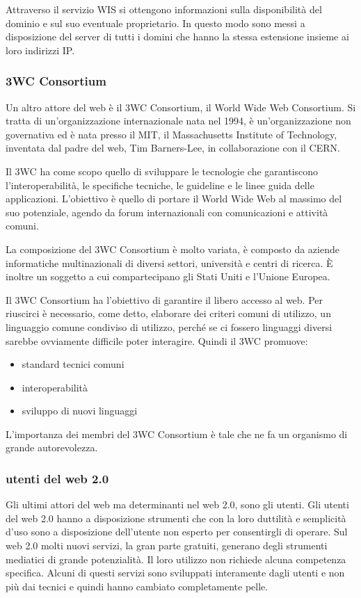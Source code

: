 Attraverso il servizio WIS si ottengono informazioni sulla disponibilità del dominio e sul suo eventuale proprietario. In questo modo sono messi a disposizione del server di tutti i domini che hanno la stessa estensione insieme ai loro indirizzi IP.
\subsubsection{3WC Consortium}

Un altro attore del web è il 3WC Consortium, il World Wide Web Consortium. Si tratta di un'organizzazione internazionale nata nel 1994, è un'organizzazione non governativa ed è nata presso il MIT, il Massachusetts Institute of Technology, inventata dal padre del web, Tim Barners-Lee, in collaborazione con il CERN. \par
Il 3WC ha come scopo quello di sviluppare le tecnologie che garantiscono l'interoperabilità, le specifiche tecniche, le guideline e le linee guida delle applicazioni. L'obiettivo è quello di portare il World Wide Web al massimo del suo potenziale, agendo da forum internazionali con comunicazioni e attività comuni. \par
La composizione del 3WC Consortium è molto variata, è composto da aziende informatiche multinazionali di diversi settori, università e centri di ricerca. È inoltre un soggetto a cui compartecipano gli Stati Uniti e l'Unione Europea. \par
Il 3WC Consortium ha l'obiettivo di garantire il libero accesso al web. Per riuscirci è necessario, come detto, elaborare dei criteri comuni di utilizzo, un linguaggio comune condiviso di utilizzo, perché se ci fossero linguaggi diversi sarebbe ovviamente difficile poter interagire. Quindi il 3WC promuove:
\begin{itemize}
    \item standard tecnici comuni
    \item interoperabilità
    \item sviluppo di nuovi linguaggi
\end{itemize}

L'importanza dei membri del 3WC Consortium è tale che ne fa un organismo di grande autorevolezza.


\subsubsection{utenti del web 2.0}
Gli ultimi attori del web ma determinanti nel web 2.0, sono gli utenti.
Gli utenti del web 2.0 hanno a disposizione strumenti che con la loro duttilità e semplicità d'uso sono a disposizione dell'utente non esperto per consentirgli di operare. Sul web 2.0 molti nuovi servizi, la gran parte gratuiti, generano degli strumenti mediatici di grande potenzialità. Il loro utilizzo non richiede alcuna competenza specifica. Alcuni di questi servizi sono sviluppati interamente dagli utenti e non più dai tecnici e quindi hanno cambiato completamente pelle.

